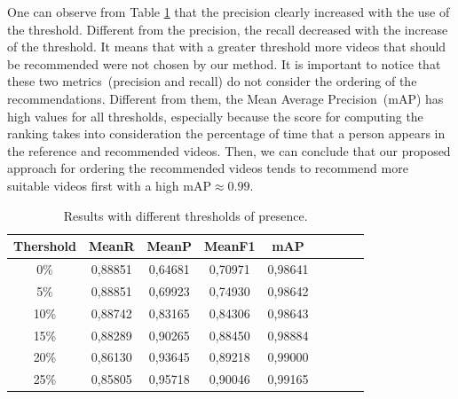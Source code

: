 One can observe from Table \ref{tab:results} that the precision clearly increased with the use of the threshold.
Different from the precision, the recall decreased with the increase of the threshold. It means that with a greater threshold more videos that should be recommended were not chosen by our method.
It is important to notice that these two metrics~(precision and recall) do not consider the ordering of the recommendations.
Different from them, the Mean Average Precision~(mAP) has high values for all thresholds, especially because the score for computing the ranking takes into consideration the percentage of time that a person appears in the reference and recommended videos.
Then, we can conclude that our proposed approach for ordering the recommended videos tends to recommend more suitable videos first with a high mAP$\approx0.99$.

\begin{table}[!ht]
\small
\centering
\caption{Results with different thresholds of presence.}
\label{tab:results}
\begin{tabular}{ccccccccc}
\hline
\textbf{Thershold} & \textbf{MeanR} & \textbf{MeanP} & \textbf{MeanF1}  & \textbf{mAP} \\ \hline
0\%                & 0,88851        & 0,64681        & 0,70971          & 0,98641      \\
5\%                & 0,88851        & 0,69923        & 0,74930          & 0,98642      \\
10\%               & 0,88742        & 0,83165        & 0,84306          & 0,98643      \\
15\%               & 0,88289        & 0,90265        & 0,88450          & 0,98884      \\
20\%               & 0,86130        & 0,93645        & 0,89218          & 0,99000      \\
25\%               & 0,85805        & 0,95718        & 0,90046          & 0,99165     
\end{tabular}
\end{table}
